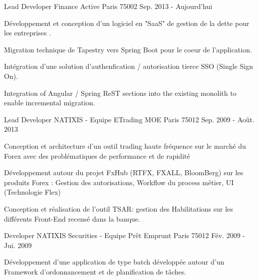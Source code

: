 \begin{cventries}
  \cventry
    {Lead Developer}
    {Finance Active}
    {Paris 75002}
    {Sep. 2013 - Aujourd'hui}
    {
      \begin{cvitems}
      	\item {Développement et conception d'un logiciel en "SaaS" de gestion de la dette pour les entreprises .}
        \item {Migration technique de Tapestry vers Spring Boot pour le coeur de l'application.}
        \item {Intégration d'une solution d'authenfication / autorisation tierce SSO (Single Sign On).}
        \item {Integration of Angular / Spring ReST sections into the existing monolith to enable incremental migration.}
      \end{cvitems}
    }
  \cventry
    {Lead Developer}
    {NATIXIS - Equipe ETrading MOE}
    {Paris 75012}
    {Sep. 2009 - Août. 2013}
    {
      \begin{cvitems}
         \item {Conception et architecture d'un outil trading haute fréquence sur le marché du Forex avec des problématiques de performance et de rapidité}
         \item {Développement autour du projet FxHub (RTFX, FXALL, BloomBerg) sur les produits Forex : Gestion des autorisations, Workflow du process métier, UI (Technologie Flex)}
        \item {Conception et réalisation de l'outil TSAR: gestion des Habilitations sur les différents Front-End recensé dans la banque.}
      \end{cvitems}
    }
  \cventry
    {Developer}
    {NATIXIS Securities - Equipe Prêt Emprunt}
    {Paris 75012}
    {Fév. 2009 - Jui. 2009}
    {
      \begin{cvitems}
        \item {Développement d’une application de type batch développée autour d’un Framework d’ordonnancement et de planification de tâches.}
      \end{cvitems} 
    }
\end{cventries}
